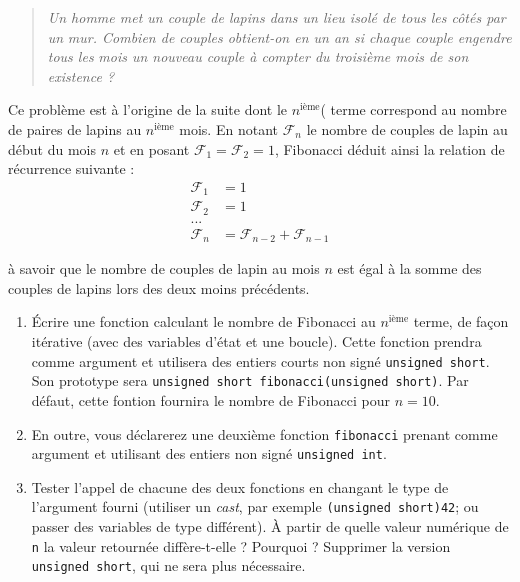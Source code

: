 \documentclass{book}
\newcommand{\inline}[1]{\texttt{#1}}
\begin{document}
\begin{quote}
\emph{Un homme met un couple de lapins dans un lieu isolé de tous les côtés par un}
\emph{mur. Combien de couples obtient-on en un an si chaque couple engendre tous les}
\emph{mois un nouveau couple à compter du troisième mois de son existence ?}
\end{quote}

Ce problème est à l'origine de la suite dont le \(n\)\(^{\text{ième}}\)( terme
correspond au nombre de paires de lapins au \(n\)\(^{\text{ième}}\) mois. En
notant \(\mathcal{F}_n\) le nombre de couples de lapin au début du mois
\(n\) et en posant \(\mathcal{F}_1=\mathcal{F}_2=1\), Fibonacci déduit
ainsi la relation de récurrence suivante :
\begin{align*}
\mathcal{F}_1 &= 1 \\
\mathcal{F}_2 &= 1 \\
...\\
\mathcal{F}_n &= \mathcal{F}_{n-2}+\mathcal{F}_{n-1}
\end{align*}

à savoir que le nombre de couples de lapin au mois \(n\) est égal à la
somme des couples de lapins lors des deux moins précédents.\\

\begin{enumerate}
\item Écrire une fonction calculant le nombre de Fibonacci au \(n\)\(^{\text{ième}}\) terme, de façon itérative (avec des variables d'état et une boucle). Cette fonction prendra comme argument et utilisera des entiers courts non signé \inline{unsigned short}. Son prototype sera \inline{unsigned short fibonacci(unsigned short)}. Par défaut, cette fontion fournira le nombre de Fibonacci pour \(n=10\).

\item En outre, vous déclarerez une deuxième fonction \inline{fibonacci} prenant comme argument et utilisant des
entiers non signé \inline{unsigned int}.

\item Tester l'appel de chacune des deux fonctions en changant le type de l'argument fourni (utiliser un \textit{cast}, par exemple \inline{(unsigned short)42}; ou passer des variables de type différent). À partir de quelle valeur numérique de \texttt{n} la valeur retournée diffère-t-elle ? Pourquoi ? Supprimer la version \inline{unsigned short}, qui ne sera plus nécessaire.
\end{enumerate}
\end{document}
